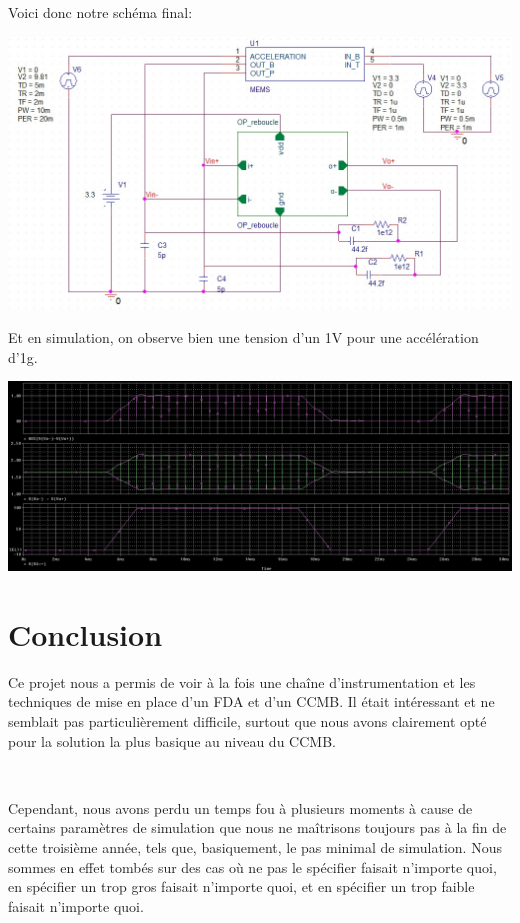 \documentclass{article}
\begin{document}
Voici donc notre schéma final:

\includegraphics[width=\linewidth]{schema_final.jpg}

Et en simulation, on observe bien une tension d’un 1V pour une accélération d’1g.

\includegraphics[width=\linewidth]{simulation_finale.jpg}

\newpage

\section*{Conclusion}

Ce projet nous a permis de voir à la fois une chaîne d’instrumentation et les techniques de mise en place d’un FDA et d’un CCMB.
Il était intéressant et ne semblait pas particulièrement difficile, surtout que nous avons clairement opté pour la solution la plus basique au niveau du CCMB.

~

Cependant, nous avons perdu un temps fou à plusieurs moments à cause de certains paramètres de simulation que nous ne maîtrisons toujours pas à la fin de cette troisième année, tels que, basiquement, le pas minimal de simulation. Nous sommes en effet tombés sur des cas où ne pas le spécifier faisait n’importe quoi, en spécifier un trop gros faisait n’importe quoi, et en spécifier un trop faible faisait n’importe quoi.
\end{document}
